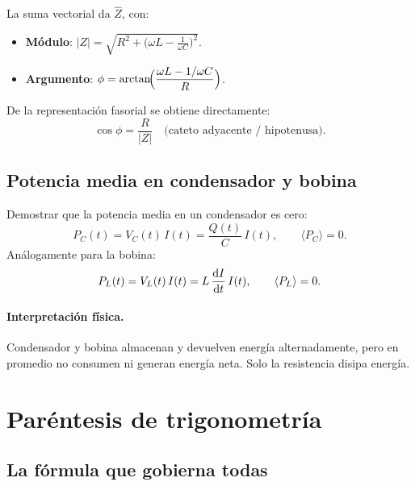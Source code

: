 \documentclass[12pt,a4paper]{article}
\begin{document}
La suma vectorial da \(\hat{Z}\), con:
\begin{itemize}
  \item \textbf{Módulo}:
        \(\displaystyle |Z| = \sqrt{R^2 + \bigl(\omega L - \tfrac{1}{\omega C}\bigr)^2}\).
  \item \textbf{Argumento}:
        \(\displaystyle \phi = \arctan\!\Bigl(\frac{\omega L - 1/\omega C}{R}\Bigr)\).
\end{itemize}

De la representación fasorial se obtiene directamente:
\[
\cos\phi = \frac{R}{|Z|}\quad\text{(cateto adyacente / hipotenusa)}.
\]



\subsection{Potencia media en condensador y bobina}

\begin{notebox}
  Demostrar que la potencia media en un condensador es cero:
  \[
  P_C(t) = V_C(t)\, I(t) = \frac{Q(t)}{C}\, I(t),\qquad
  \langle P_C \rangle = 0.
  \]
  Análogamente para la bobina:
  \[
  P_L(t) = V_L(t)\, I(t) = L\,\dv{I}{t}\, I(t),\qquad
  \langle P_L \rangle = 0.
  \]
\end{notebox}

\paragraph{Interpretación física.}
Condensador y bobina almacenan y devuelven energía alternadamente,
pero en promedio no consumen ni generan energía neta. Solo la
resistencia disipa energía.

\section{Paréntesis de trigonometría}

\subsection{La fórmula que gobierna todas}
\end{document}
